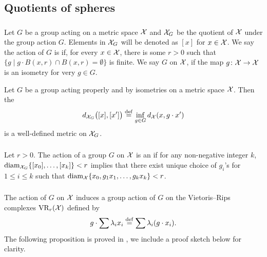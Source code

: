 
\subsection{Quotients of spheres}

\subsubsection{}


Let $G$ be a group acting on a metric space $\mathcal{X}$ and $\mathcal{X}_G$ be the quotient of $\mathcal{X}$ under the group action $G$.
Elements in $\mathcal{X}_G$ will be denoted as $[x]$ for $x \in \mathcal{X}$.
We say the action of $G$ is  if, for every $x \in \mathcal{X}$, there is some $r>0$ such that $\{g \mid g\cdot B(x,r) \cap B(x,r) = \emptyset\}$ is finite.
We say $G$  on $\mathcal{X}$, if the map $g \colon \mathcal{X} \to \mathcal{X}$ is an isometry for very $g \in G$.

Let $G$ be a group acting properly and by isometries on a metric space $\mathcal{X}$.
Then the 
\[
d_{\mathcal{X}_G}\big([x], [x']\big) \stackrel{\mathrm{def}}{=} \inf_{g\in G} d_{\mathcal{X}}(x, g\cdot x')
\]
is a well-defined metric on $\mathcal{X}_G$.

\subsubsection{}

Let $r>0$.
The action of a group $G$ on $\mathcal{X}$ is an  if for any non-negative integer $k$, $\operatorname{diam}_{\mathcal{X}_G}\{[x_0],\dots,[x_k]\}<r$ implies that there exist unique choice of $g_i$'s for $1\leq i\leq k$ such that $\operatorname{diam}_{\mathcal{X}}\{x_0,g_1x_1,\dots,g_kx_k\}<r$.

\subsubsection{}\label{subsub:h}

The action of $G$ on $\mathcal{X}$ induces a group action of $G$ on the Vietoris--Rips complexes $\operatorname{VR}_r(\mathcal{X})$ defined by
\[
g \cdot \sum \lambda_i x_i \stackrel{\mathrm{def}}{=} \sum \lambda_i (g\cdot x_i).
\]
The following proposition is proved in \cite[Proposition 3.5]{adams2022metric}, we include a proof sketch below for clarity.

